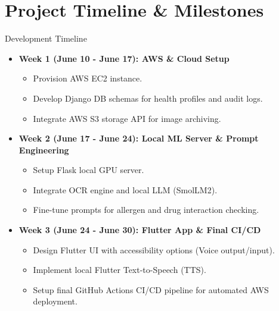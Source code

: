 \section{Project Timeline \& Milestones}

\begin{frame}{Development Timeline}
    \begin{itemize}
        \item \textbf{Week 1 (June 10 - June 17): AWS \& Cloud Setup}
            \begin{itemize}
                \item Provision AWS EC2 instance.
                \item Develop Django DB schemas for health profiles and audit logs.
                \item Integrate AWS S3 storage API for image archiving.
            \end{itemize}
        \item \textbf{Week 2 (June 17 - June 24): Local ML Server \& Prompt Engineering}
            \begin{itemize}
                \item Setup Flask local GPU server.
                \item Integrate OCR engine and local LLM (SmolLM2).
                \item Fine-tune prompts for allergen and drug interaction checking.
            \end{itemize}
        \item \textbf{Week 3 (June 24 - June 30): Flutter App \& Final CI/CD}
            \begin{itemize}
                \item Design Flutter UI with accessibility options (Voice output/input).
                \item Implement local Flutter Text-to-Speech (TTS).
                \item Setup final GitHub Actions CI/CD pipeline for automated AWS deployment.
            \end{itemize}
    \end{itemize}
\end{frame}

